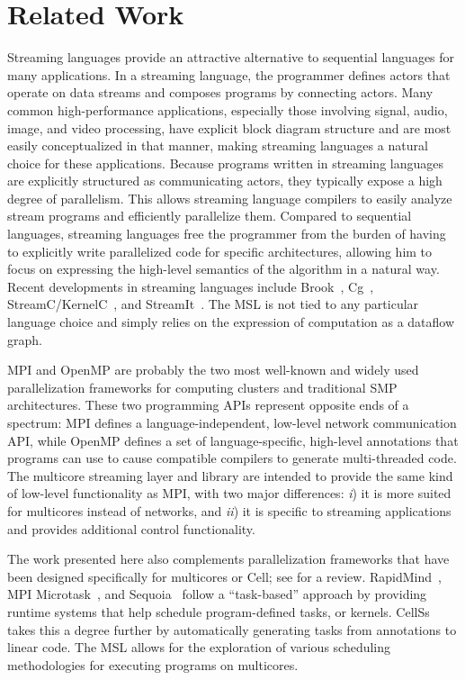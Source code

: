 \section{Related Work}\label{ch:bg}

Streaming languages provide an attractive alternative to sequential
languages for many applications. In a streaming language, the
programmer defines actors that operate on data streams and composes
programs by connecting actors. Many common high-performance
applications, especially those involving signal, audio, image, and
video processing, have explicit block diagram structure and are most
easily conceptualized in that manner, making streaming languages a
natural choice for these applications.
Because programs written in streaming languages are explicitly
structured as communicating actors, they typically expose a high
degree of parallelism. This allows streaming language compilers to
easily analyze stream programs and efficiently parallelize
them. Compared to sequential languages, streaming languages free the
programmer from the burden of having to explicitly write parallelized
code for specific architectures, allowing him to focus on expressing
the high-level semantics of the algorithm in a natural way.
Recent developments in streaming languages include Brook~\cite{brook},
Cg~\cite{cg}, StreamC/KernelC~\cite{streamc}, and StreamIt~\cite{streamitweb}.
The MSL is not tied to any particular language choice and simply
relies on the expression of computation as a dataflow graph.
 
MPI and OpenMP are probably the two most well-known and widely used
parallelization frameworks for computing clusters and traditional SMP
architectures. These two programming APIs represent opposite ends of a
spectrum: MPI defines a language-independent, low-level network
communication API, while OpenMP defines a set of language-specific,
high-level annotations that programs can use to cause compatible
compilers to generate multi-threaded code.  The multicore streaming
layer and library are intended to provide the same kind of low-level
functionality as MPI, with two major differences: \emph{i}) it is more
suited for multicores instead of networks, and \emph{ii}) it is
specific to streaming applications and provides additional control
functionality.

The work presented here also complements parallelization frameworks
that have been designed specifically for multicores or Cell; see
\cite{cell:pf} for a review. RapidMind~\cite{rapidmind}, MPI
Microtask~\cite{mpimicrotask}, and Sequoia~\cite{sequoia} follow a
``task-based'' approach by providing runtime systems that help
schedule program-defined tasks, or kernels. CellSs~\cite{cellss} takes
this a degree further by automatically generating tasks from
annotations to linear code. The MSL allows for the exploration of
various scheduling methodologies for executing programs on multicores.

